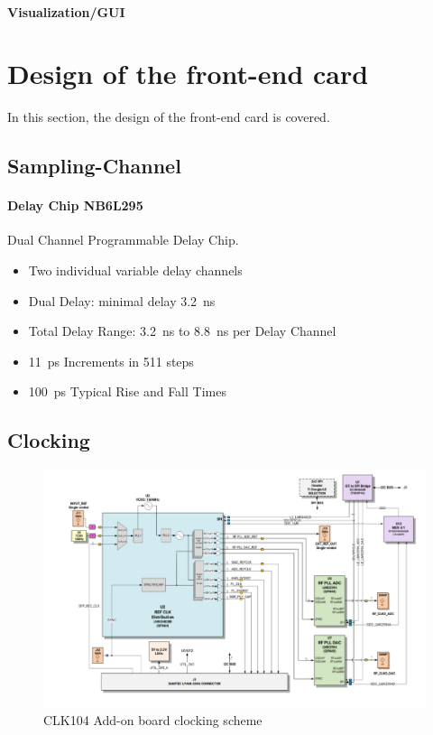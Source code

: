 \paragraph{Visualization/GUI}
\newpage
\section{Design of the front-end card}
In this section, the design of the front-end card is covered.

\subsection{Sampling-Channel}
\paragraph{Delay Chip NB6L295}
Dual Channel Programmable Delay Chip.

\begin{itemize}
	\item Two individual variable delay channels
	\item Dual Delay: minimal delay \SI{3.2}{\nano \second}
	\item Total Delay Range: \SI{3.2}{\nano \second} to \SI{8.8}{\nano \second} per Delay Channel
	\item \SI{11}{\pico \second} Increments in 511 steps
	\item \SI{100}{\pico \second} Typical Rise and Fall Times
\end{itemize}

\subsection{Clocking}
\begin{figure}[H]
	\centering
	\includegraphics[width = \textwidth]{chap/03-work/img/clk104.png}
	\caption{CLK104 Add-on board clocking scheme}
	\label{fig:clk104}
\end{figure}

